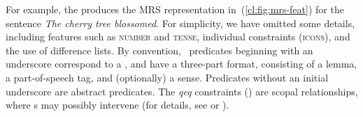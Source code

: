 \documentclass[output=paper,biblatex,babelshorthands,newtxmath,draftmode,colorlinks,citecolor=brown]{langscibook}
\begin{document}
For example, the 
produces the MRS representation in~(\ref{cl:fig:mrs-feat})
for the sentence \emph{The cherry tree blossomed}.
For simplicity, we have omitted some details, including
features such as \textsc{number} and \textsc{tense},
individual constraints (\textsc{icons}),
and the use of difference lists.
By convention, \delphin\ predicates beginning with an
underscore correspond to a , and have a three-part format,
consisting of a lemma, a part-of-speech tag, and (optionally) a sense.
Predicates without an initial underscore are abstract predicates.
The \textit{qeq} constraints ()
are scopal relationships, where s may possibly intervene
(for details, see \citealt{CFPS2005a} or ).

\begin{exe}
	\ex\label{cl:fig:mrs-feat}
\end{exe}
\end{document}
